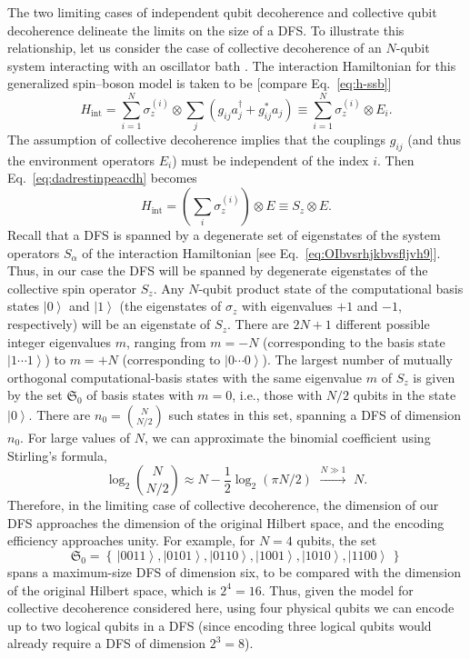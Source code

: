 \documentclass[aps,pra,reprint,amsmath,amssymb,showpacs,nofootinbib,floatfix,onecolumn,12pt]{revtex4-1}
\newcommand{\ket}[1]{\left\vert{#1}\right\rangle}
\begin{document}
The two limiting cases of independent qubit decoherence and collective qubit decoherence delineate the limits on the size of a DFS.  To illustrate this relationship, let us consider the case of collective decoherence of an $N$-qubit system interacting with an oscillator bath \cite{Palma:1996:yy,Duan:1998:yb,Reina:2002:ta,Zanardi:1997:yy,Zanardi:1998:oo}. The interaction Hamiltonian for this generalized spin--boson model is taken to be [compare Eq.~\eqref{eq:h-ssb}] 
%
\begin{equation}
  \label{eq:dadrestinpeacdh}
  H_\text{int} =  \sum_{i=1}^N  \sigma_z^{(i)} \otimes \sum_j
  \left( g_{ij}a_j^\dagger + g_{ij}^* a_j \right) \equiv
  \sum_{i=1}^N  \sigma_z^{(i)} \otimes E_i.
\end{equation}
%
The assumption of collective decoherence implies that the couplings $g_{ij}$ (and thus the environment operators $E_i$) must be independent of the index $i$. Then Eq.~\eqref{eq:dadrestinpeacdh} becomes
%
\begin{equation}
\label{eq:dadrestinpeacfxndh}
H_\text{int} =  \left( \sum_{i} \sigma_z^{(i)} \right)
\otimes E \equiv
S_z \otimes E.
\end{equation}
%
Recall that a DFS is spanned by a degenerate set of eigenstates of the system operators $S_\alpha$ of the interaction Hamiltonian [see Eq.~\eqref{eq:OIbvsrhjkbvsfljvh9}]. Thus, in our case the DFS will be spanned by degenerate eigenstates of the collective spin operator $S_z$. Any $N$-qubit product state of the computational basis states $\ket{0}$ and $\ket{1}$ (the eigenstates of $\sigma_z$ with eigenvalues $+1$ and $-1$, respectively) will be an eigenstate of $S_z$. There are $2N+1$ different possible integer eigenvalues $m$, ranging from $m=-N$ (corresponding to the basis state $\ket{1\cdots 1}$) to $m=+N$ (corresponding to $\ket{0\cdots 0}$). The largest number of mutually orthogonal computational-basis states with the same eigenvalue $m$ of $S_z$ is given by the set $\mathfrak{S}_0$ of basis states with $m=0$, i.e., those with $N/2$ qubits in the state $\ket{0}$. There are $n_0 = \binom{N}{N/2}$ such states in this set, spanning a DFS of dimension $n_0$. For large values of $N$, we can approximate the binomial coefficient using Stirling's formula,
%
\begin{equation}
 \log_2 \binom{N}{N/2} \approx N - \frac{1}{2} \log_2 (\pi N/2) \,\,
 \xrightarrow{N \gg 1} \,\, N.
\end{equation}
%
Therefore, in the limiting case of collective decoherence, the dimension of our DFS approaches the dimension of the original
Hilbert space, and the encoding efficiency approaches unity. For example, for $N=4$ qubits, the set 
%
\begin{equation}
  \label{eq:39}
  \mathfrak{S}_0 = \left\{\, \ket{0011}, \ket{0101}, \ket{0110}, \ket{1001}, \ket{1010}, 
\ket{1100} \, \right\}
\end{equation}
%
spans a maximum-size DFS of dimension six, to be compared with the dimension of the original Hilbert space, which is $2^4 = 16$. Thus, given the model for
collective decoherence considered here, using four physical qubits we can encode up to two logical qubits in a DFS (since encoding three logical qubits would already require a DFS of dimension $2^3=8$). 
\end{document}
